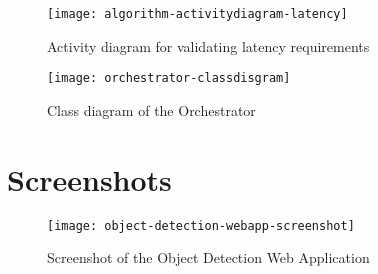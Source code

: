 \begin{figure}[htb]
    \centering
    \texttt{[image: algorithm-activitydiagram-latency]}
    \caption{Activity diagram for validating latency requirements}
    \label{fig:algorithm-activitydiagram-latency}
\end{figure}

\begin{figure}[htb]
    \centering
    \texttt{[image: orchestrator-classdisgram]}
    \caption{Class diagram of the Orchestrator}
    \label{fig:orchestrator-classdisgram}
\end{figure}

\clearpage
\chapter{Screenshots\label{cha:appendix-screenshots}}
\begin{figure}[htb]
    \centering
    \texttt{[image: object-detection-webapp-screenshot]}
    \caption{Screenshot of the Object Detection Web Application}
    \label{fig:object-detection-webapp-screenshot}
\end{figure}